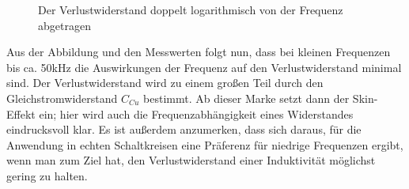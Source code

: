 \documentclass{article}
\begin{document}
\begin{figure}[h]
  \begin{center}

    \caption{Der Verlustwiderstand doppelt logarithmisch von der Frequenz abgetragen}
  \end{center}
\end{figure}
Aus der Abbildung und den Messwerten folgt nun, dass bei kleinen Frequenzen bis ca. 50kHz die Auswirkungen der Frequenz auf den Verlustwiderstand minimal sind.
Der Verlustwiderstand wird zu einem großen Teil durch den Gleichstromwiderstand $C_{Cu}$ bestimmt. Ab dieser Marke setzt dann der Skin-Effekt ein; hier wird auch die
Frequenzabhängigkeit eines Widerstandes eindrucksvoll klar. Es ist außerdem anzumerken, dass sich daraus, für die Anwendung in echten Schaltkreisen eine Präferenz für niedrige Frequenzen ergibt,
wenn man zum Ziel hat, den Verlustwiderstand einer Induktivität möglichst gering zu halten.
\end{document}
